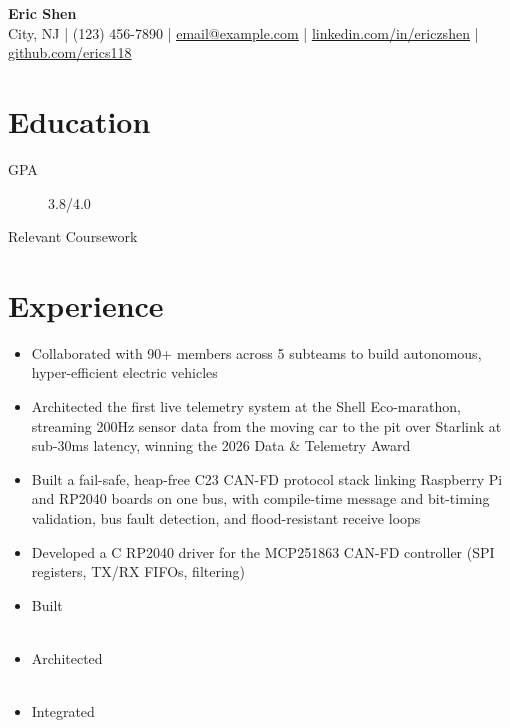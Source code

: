 \documentclass[11pt]{article}
\newcommand{\link}[1]{\href{https://#1}{\uline{#1}}}
\newcommand{\email}[1]{\href{mailto:#1}{\uline{#1}}}
\newcommand{\name}[1]{{\Huge \textbf{#1}} \\ \vspace{3pt plus 3fil minus 2pt}}
\newcommand{\cpp}{\BeginAccSupp{ActualText=C++}C\nolinebreak\hspace{-.05em}\raisebox{.3ex}{\footnotesize +\kern-.05em+}\EndAccSupp{}}
\begin{document}
\begin{center}
    \name{Eric Shen}
    City, NJ |
    (123) 456-7890 |
    \email{email@example.com} |
    \link{linkedin.com/in/ericzshen} |
    \link{github.com/erics118}
\end{center}

\section{Education}

\begin{description}
    \item[GPA] 3.8/4.0
    \item[Relevant Coursework] 
\end{description}

\section{Experience}

\begin{itemize}
    \item Collaborated with 90+ members across 5 subteams to build autonomous, hyper-efficient electric vehicles
    \item Architected the first live telemetry system at the Shell Eco-marathon, streaming 200Hz sensor data from the moving car to the pit over Starlink at sub-30ms latency, winning the 2026 Data \& Telemetry Award
    \item Built a fail-safe, heap-free \cpp{}23 CAN-FD protocol stack linking Raspberry Pi and RP2040 boards on one bus, with compile-time message and bit-timing validation, bus fault detection, and flood-resistant receive loops
    \item Developed a \cpp{} RP2040 driver for the MCP251863 CAN-FD controller (SPI registers, TX/RX FIFOs, filtering)
\end{itemize}

\begin{itemize}
    \item Built\\~
    \item Architected\\~
    \item Integrated
\end{itemize}
\end{document}
